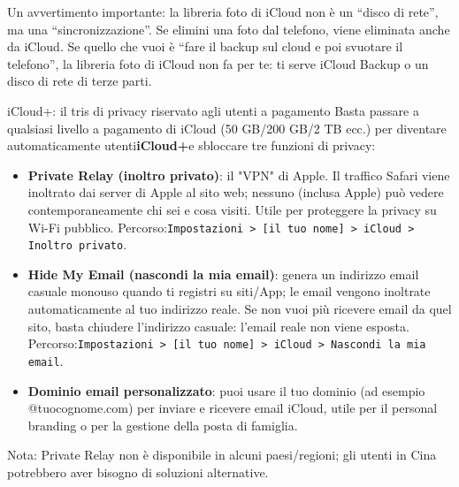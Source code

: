 Un avvertimento importante: la libreria foto di iCloud non è un “disco di rete”, ma una “sincronizzazione”. Se elimini una foto dal telefono, viene eliminata anche da iCloud. Se quello che vuoi è “fare il backup sul cloud e poi svuotare il telefono”, la libreria foto di iCloud non fa per te: ti serve iCloud Backup o un disco di rete di terze parti.

\begin{tcbinfo}{iCloud+: il tris di privacy riservato agli utenti a pagamento}
Basta passare a qualsiasi livello a pagamento di iCloud (50 GB/200 GB/2 TB ecc.) per diventare automaticamente utenti\textbf{iCloud+}e sbloccare tre funzioni di privacy:

\begin{itemize}
  \item \textbf{Private Relay (inoltro privato)}: il "VPN" di Apple. Il traffico Safari viene inoltrato dai server di Apple al sito web; nessuno (inclusa Apple) può vedere contemporaneamente chi sei e cosa visiti. Utile per proteggere la privacy su Wi-Fi pubblico. Percorso:\texttt{Impostazioni > [il tuo nome] > iCloud > Inoltro privato}.
  \item \textbf{Hide My Email (nascondi la mia email)}: genera un indirizzo email casuale monouso quando ti registri su siti/App; le email vengono inoltrate automaticamente al tuo indirizzo reale. Se non vuoi più ricevere email da quel sito, basta chiudere l'indirizzo casuale: l'email reale non viene esposta. Percorso:\texttt{Impostazioni > [il tuo nome] > iCloud > Nascondi la mia email}.
  \item \textbf{Dominio email personalizzato}: puoi usare il tuo dominio (ad esempio @tuocognome.com) per inviare e ricevere email iCloud, utile per il personal branding o per la gestione della posta di famiglia.
\end{itemize}

Nota: Private Relay non è disponibile in alcuni paesi/regioni; gli utenti in Cina potrebbero aver bisogno di soluzioni alternative.

\end{tcbinfo}

